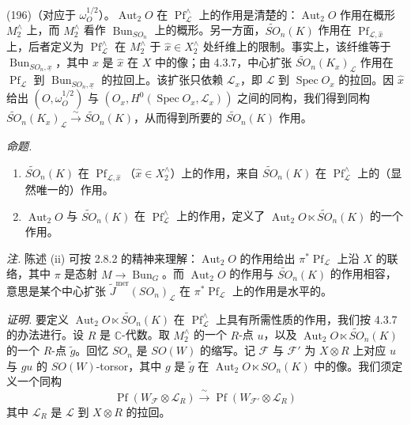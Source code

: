 
(196)（对应于 $\omega_{O}^{1/2}$）。$\operatorname{Aut}_{2}O$ 在 $\operatorname{Pf}_{\mathcal{L}}^{\wedge}$ 上的作用是清楚的：$\operatorname{Aut}_{2}O$ 作用在概形 $M_{2}^{\wedge}$ 上，而 $M_{2}^{\wedge}$ 看作 $\operatorname{Bun}_{SO_{n}}$ 上的概形。另一方面，$\tilde{SO}_{n}(K)$ 作用在 $\operatorname{Pf}_{\mathcal{L},\hat x}$ 上，后者定义为 $\operatorname{Pf}_{\mathcal{L}}^{\wedge}$ 在 $M_{2}^{\wedge}$ 于 $\hat x\in X_{2}^{\wedge}$ 处纤维上的限制。事实上，该纤维等于 $\operatorname{Bun}_{SO_{n},\underline{x}}$，其中 $x$ 是 $\hat x$ 在 $X$ 中的像；由 4.3.7，中心扩张 $\tilde{SO}_{n}(K_{x})_{\mathcal{L}}$ 作用在 $\operatorname{Pf}_{\mathcal{L}}$ 到 $\operatorname{Bun}_{SO_{n},\underline{x}}$ 的拉回上。该扩张只依赖 $\mathcal{L}_{x}$，即 $\mathcal{L}$ 到 $\operatorname{Spec}O_{x}$ 的拉回。因 $\hat x$ 给出 $(O,\omega_{O}^{1/2})$ 与 $(O_{x},H^{0}(\operatorname{Spec}O_{x},\mathcal{L}_{x}))$ 之间的同构，我们得到同构 $\tilde{SO}_{n}(K_{x})_{\mathcal{L}}\xrightarrow{\ \sim\ }\tilde{SO}_{n}(K)$，从而得到所要的 $\tilde{SO}_{n}(K)$ 作用。

 \emph{命题.}
\begin{enumerate}[label=(\roman*),leftmargin=2.2em]
\item $\tilde{SO}_{n}(K)$ 在 $\operatorname{Pf}_{\mathcal{L},\hat x}$（$\hat x\in X_{2}^{\wedge}$）上的作用，来自 $\tilde{SO}_{n}(K)$ 在 $\operatorname{Pf}_{\mathcal{L}}^{\wedge}$ 上的（显然唯一的）作用。
\item $\operatorname{Aut}_{2}O$ 与 $\tilde{SO}_{n}(K)$ 在 $\operatorname{Pf}_{\mathcal{L}}^{\wedge}$ 上的作用，定义了 $\operatorname{Aut}_{2}O\ltimes\tilde{SO}_{n}(K)$ 的一个作用。
\end{enumerate}

\emph{注.} 陈述 (ii) 可按 2.8.2 的精神来理解：$\operatorname{Aut}_{2}O$ 的作用给出 $\pi^{*}\operatorname{Pf}_{\mathcal{L}}$ 上沿 $X$ 的联络，其中 $\pi$ 是态射 $M\to\operatorname{Bun}_{G}$。而 $\operatorname{Aut}_{2}O$ 的作用与 $\tilde{SO}_{n}(K)$ 的作用相容，意思是某个中心扩张 $\tilde{J}^{\mathrm{mer}}(SO_{n})_{\mathcal{L}}$ 在 $\pi^{*}\operatorname{Pf}_{\mathcal{L}}$ 上的作用是水平的。

\emph{证明.} 要定义 $\operatorname{Aut}_{2}O\ltimes\tilde{SO}_{n}(K)$ 在 $\operatorname{Pf}_{\mathcal{L}}^{\wedge}$ 上具有所需性质的作用，我们按 4.3.7 的办法进行。设 $R$ 是 $\mathbb{C}$-代数。取 $M_{2}^{\wedge}$ 的一个 $R$-点 $u$，以及 $\operatorname{Aut}_{2}O\ltimes\tilde{SO}_{n}(K)$ 的一个 $R$-点 $\tilde{g}$。回忆 $SO_{n}$ 是 $SO(W)$ 的缩写。记 $\mathcal{F}$ 与 $\mathcal{F}'$ 为 $X\otimes R$ 上对应 $u$ 与 $gu$ 的 $SO(W)$-torsor，其中 $g$ 是 $\tilde{g}$ 在 $\operatorname{Aut}_{2}O\ltimes SO_{n}(K)$ 中的像。我们须定义一个同构
\begin{equation}\tag{206}
\operatorname{Pf}(W_{\mathcal{F}}\otimes\mathcal{L}_{R})\xrightarrow{\ \sim\ }\operatorname{Pf}(W_{\mathcal{F}'}\otimes\mathcal{L}_{R})
\end{equation}
其中 $\mathcal{L}_{R}$ 是 $\mathcal{L}$ 到 $X\otimes R$ 的拉回。

